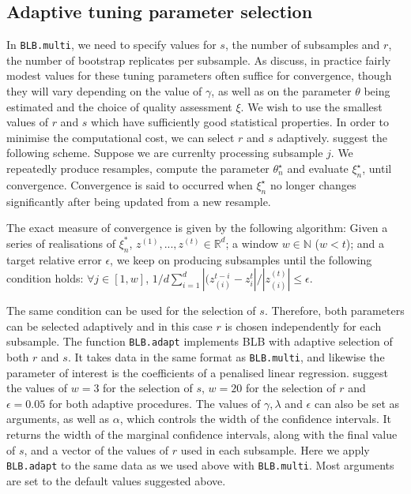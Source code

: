 \documentclass{article}\usepackage[]{graphicx}\usepackage[]{color}
\begin{document}
\subsection{Adaptive tuning parameter selection}
In \texttt{BLB.multi}, we need to specify values for $s$, the number of subsamples and $r$, the number of bootstrap replicates per subsample. As \textcite{Kleiner2014} discuss, in practice fairly modest values for these tuning parameters often suffice for convergence, though they will vary depending on the value of $\gamma$, as well as on the parameter $\theta$ being estimated and the choice of quality assessment $\xi$. We wish to use the smallest values of $r$ and $s$ which have sufficiently good statistical properties. In order to minimise the computational cost, we can select $r$ and $s$ adaptively. \textcite{Kleiner2014} suggest the following scheme. Suppose we are currenlty processing subsample $j$. We repeatedly produce resamples, compute the parameter $\theta^{\star}_{n}$ and evaluate $\xi^{\star}_{n}$, until convergence. Convergence is said to occurred when $\xi^{\star}_{n}$ no longer changes significantly after being updated from a new resample.

The exact measure of convergence is given by the following algorithm: Given a series of realisations of $\xi_n^*$, $ z^{(1)} ,..., z^{(t)}\in \mathbb{R}^{d}$; a window $w \in \mathbb{N}$ ($ w<t $); and a target relative error $\epsilon$,  we keep on producing subsamples until the following condition holds: $\forall j \in [1,w]$,
$ 1/d \sum_{i=1}^{d} | (z_{(i)}^{t-i}-z_{i}^{t} | / |z_{(i)}^{(t)} | \leq \epsilon $.

The same condition can be used for the selection of $s$. Therefore, both parameters can be selected adaptively and in this case $r$ is chosen independently for each subsample. The function \texttt{BLB.adapt} implements BLB with adaptive selection of both $r$ and $s$. It takes data in the same format as \texttt{BLB.multi}, and likewise the parameter of interest is the coefficients of a penalised linear regression. \textcite{Kleiner2014} suggest the values of $w=3$ for the selection of $s$, $w=20$ for the selection of $r$ and $\epsilon=0.05$ for both adaptive procedures. The values of $\gamma, \lambda$ and $\epsilon$ can also be set as arguments, as well as $\alpha$, which controls the width of the confidence intervals. It returns the width of the marginal confidence intervals, along with the final value of $s$, and a vector of the values of $r$ used in each subsample. Here we apply \texttt{BLB.adapt} to the same data as we used above with \texttt{BLB.multi}. Most arguments are set to the default values suggested above.
\end{document}
